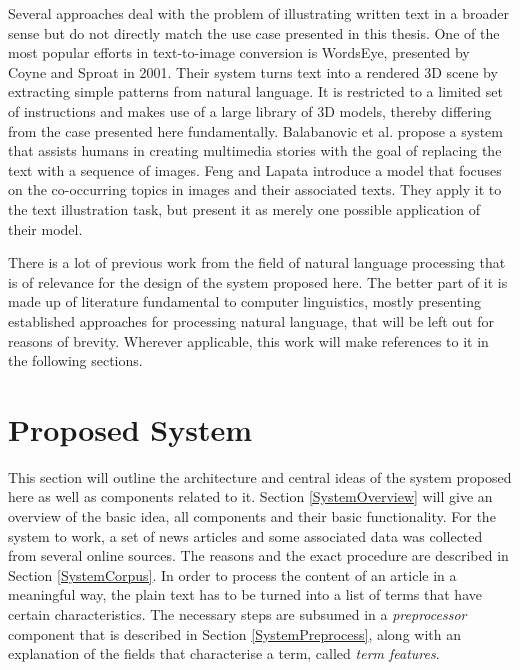 \documentclass[11pt,a4paper,twoside]{article}
\begin{document}
Several approaches deal with the problem of illustrating written text in a broader sense but do not directly match the use case presented in this thesis. One of the most popular efforts in text-to-image conversion is WordsEye, presented by Coyne and Sproat in 2001. \cite{Coyne2001WordsEye:System} Their system turns text into a rendered 3D scene by extracting simple patterns from natural language. It is restricted to a limited set of instructions and makes use of a large library of 3D models, thereby differing from the case presented here fundamentally. Balabanovic et al. propose a system that assists humans in creating multimedia stories with the goal of replacing the text with a sequence of images. \cite{Balabanovic2000StorytellingPhotographs} Feng and Lapata introduce a model that focuses on the co-occurring topics in images and their associated texts. They apply it to the text illustration task, but present it as merely one possible application of their model. \cite{Feng2010TopicIllustration}

\bigskip

There is a lot of previous work from the field of natural language processing that is of relevance for the design of the system proposed here. The better part of it is made up of literature fundamental to computer linguistics, mostly presenting established approaches for processing natural language, that will be left out for reasons of brevity. Wherever applicable, this work will make references to it in the following sections.


\cleardoublepage

\section{Proposed System} \label{System}

This section will outline the architecture and central ideas of the system proposed here as well as components related to it. Section \ref{SystemOverview} will give an overview of the basic idea, all components and their basic functionality. For the system to work, a set of news articles and some associated data was collected from several online sources. The reasons and the exact procedure are described in Section \ref{SystemCorpus}. In order to process the content of an article in a meaningful way, the plain text has to be turned into a list of terms that have certain characteristics. The necessary steps are subsumed in a \emph{preprocessor} component that is described in Section \ref{SystemPreprocess}, along with an explanation of the fields that characterise a term, called \emph{term features}.
\end{document}
